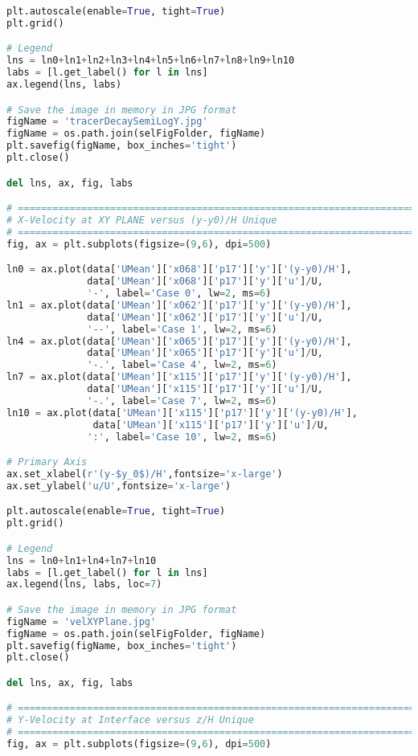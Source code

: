 \begin{lstlisting}[language=python]
plt.autoscale(enable=True, tight=True)
plt.grid()

# Legend
lns = ln0+ln1+ln2+ln3+ln4+ln5+ln6+ln7+ln8+ln9+ln10
labs = [l.get_label() for l in lns]
ax.legend(lns, labs)

# Save the image in memory in JPG format
figName = 'tracerDecaySemiLogY.jpg'
figName = os.path.join(selFigFolder, figName)
plt.savefig(figName, box_inches='tight')
plt.close()

del lns, ax, fig, labs

# =============================================================================
# X-Velocity at XY PLANE versus (y-y0)/H Unique
# =============================================================================
fig, ax = plt.subplots(figsize=(9,6), dpi=500)

ln0 = ax.plot(data['UMean']['x068']['p17']['y']['(y-y0)/H'],
              data['UMean']['x068']['p17']['y']['u']/U,
              '-', label='Case 0', lw=2, ms=6)
ln1 = ax.plot(data['UMean']['x062']['p17']['y']['(y-y0)/H'],
              data['UMean']['x062']['p17']['y']['u']/U,
              '--', label='Case 1', lw=2, ms=6)
ln4 = ax.plot(data['UMean']['x065']['p17']['y']['(y-y0)/H'],
              data['UMean']['x065']['p17']['y']['u']/U,
              '-.', label='Case 4', lw=2, ms=6)
ln7 = ax.plot(data['UMean']['x115']['p17']['y']['(y-y0)/H'],
              data['UMean']['x115']['p17']['y']['u']/U,
              '-.', label='Case 7', lw=2, ms=6)
ln10 = ax.plot(data['UMean']['x115']['p17']['y']['(y-y0)/H'],
               data['UMean']['x115']['p17']['y']['u']/U,
              ':', label='Case 10', lw=2, ms=6)

# Primary Axis
ax.set_xlabel(r'(y-$y_0$)/H',fontsize='x-large')
ax.set_ylabel('u/U',fontsize='x-large')

plt.autoscale(enable=True, tight=True)
plt.grid()

# Legend
lns = ln0+ln1+ln4+ln7+ln10
labs = [l.get_label() for l in lns]
ax.legend(lns, labs, loc=7)

# Save the image in memory in JPG format
figName = 'velXYPlane.jpg'
figName = os.path.join(selFigFolder, figName)
plt.savefig(figName, box_inches='tight')
plt.close()

del lns, ax, fig, labs

# =============================================================================
# Y-Velocity at Interface versus z/H Unique
# =============================================================================
fig, ax = plt.subplots(figsize=(9,6), dpi=500)


\end{lstlisting}
